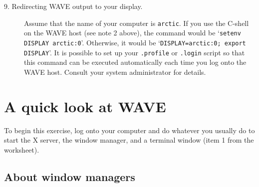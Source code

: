 \documentclass[twoside]{book}
\newcommand{\WAVE}{{\sf WAVE}\xspace}
\begin{document}
\begin{description}
\item[9. Redirecting \WAVE{} output to your display.]
\label{sec:setting-display}
Assume that the name of your computer is {\tt arctic}.
If you use the C-shell on the \WAVE{} host (see note 2 above), the
command would be `{\tt setenv DISPLAY arctic:0}'.
Otherwise, it would
be `{\tt DISPLAY=arctic:0; export DISPLAY}'.  It is possible to set up
your {\tt .profile} or {\tt .login} script so that this command can be
executed automatically each time you log onto the \WAVE{} host.
Consult your system administrator for details.

\end{description}

\newpage

\section{A quick look at \WAVE{}}

To begin this exercise, log onto your computer and do whatever you
usually do to start the X server, the window manager, and a terminal
window (item 1 from the worksheet).

\subsection*{About window managers}
\end{document}
